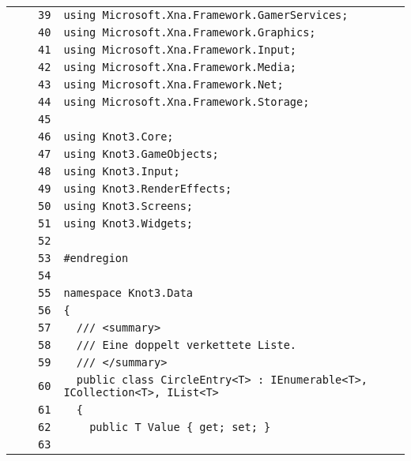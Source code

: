 \documentclass[a4paper,10pt]{article}
\begin{document}
\begin{longtable}[l]{lrrl}
\cellcolor{gray} &  & \verb~39~ & \verb~using Microsoft.Xna.Framework.GamerServices;~\\
\cellcolor{gray} &  & \verb~40~ & \verb~using Microsoft.Xna.Framework.Graphics;~\\
\cellcolor{gray} &  & \verb~41~ & \verb~using Microsoft.Xna.Framework.Input;~\\
\cellcolor{gray} &  & \verb~42~ & \verb~using Microsoft.Xna.Framework.Media;~\\
\cellcolor{gray} &  & \verb~43~ & \verb~using Microsoft.Xna.Framework.Net;~\\
\cellcolor{gray} &  & \verb~44~ & \verb~using Microsoft.Xna.Framework.Storage;~\\
\cellcolor{gray} &  & \verb~45~ & \verb~~\\
\cellcolor{gray} &  & \verb~46~ & \verb~using Knot3.Core;~\\
\cellcolor{gray} &  & \verb~47~ & \verb~using Knot3.GameObjects;~\\
\cellcolor{gray} &  & \verb~48~ & \verb~using Knot3.Input;~\\
\cellcolor{gray} &  & \verb~49~ & \verb~using Knot3.RenderEffects;~\\
\cellcolor{gray} &  & \verb~50~ & \verb~using Knot3.Screens;~\\
\cellcolor{gray} &  & \verb~51~ & \verb~using Knot3.Widgets;~\\
\cellcolor{gray} &  & \verb~52~ & \verb~~\\
\cellcolor{gray} &  & \verb~53~ & \verb~#endregion~\\
\cellcolor{gray} &  & \verb~54~ & \verb~~\\
\cellcolor{gray} &  & \verb~55~ & \verb~namespace Knot3.Data~\\
\cellcolor{gray} &  & \verb~56~ & \verb~{~\\
\cellcolor{gray} &  & \verb~57~ & \verb~  /// <summary>~\\
\cellcolor{gray} &  & \verb~58~ & \verb~  /// Eine doppelt verkettete Liste.~\\
\cellcolor{gray} &  & \verb~59~ & \verb~  /// </summary>~\\
\cellcolor{gray} &  & \verb~60~ & \verb~  public class CircleEntry<T> : IEnumerable<T>, ICollection<T>, IList<T>~\\
\cellcolor{gray} &  & \verb~61~ & \verb~  {~\\
\cellcolor{gray} &  & \verb~62~ & \verb~    public T Value { get; set; }~\\
\cellcolor{gray} &  & \verb~63~ & \verb~~\\

\end{longtable}
\end{document}

